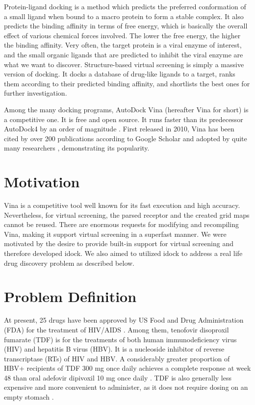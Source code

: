 \documentclass[10pt, conference, compsocconf]{IEEEtran}
\begin{document}
Protein-ligand docking is a method which predicts the preferred conformation of a small ligand when bound to a macro protein to form a stable complex. It also predicts the binding affinity in terms of free energy, which is basically the overall effect of various chemical forces involved. The lower the free energy, the higher the binding affinity. Very often, the target protein is a viral enzyme of interest, and the small organic ligands that are predicted to inhibit the viral enzyme are what we want to discover. Structure-based virtual screening is simply a massive version of docking. It docks a database of drug-like ligands to a target, ranks them according to their predicted binding affinity, and shortlists the best ones for further investigation.

Among the many docking programs, AutoDock Vina \cite{595} (hereafter Vina for short) is a competitive one. It is free and open source. It runs faster than its predecessor AutoDock4 \cite{596} by an order of magnitude \cite{556}. First released in 2010, Vina has been cited by over 200 publications according to Google Scholar and adopted by quite many researchers \cite{609}, demonstrating its popularity.

\section{Motivation}

Vina is a competitive tool well known for its fast execution and high accuracy. Nevertheless, for virtual screening, the parsed receptor and the created grid maps cannot be reused. There are enormous requests for modifying and recompiling Vina, making it support virtual screening in a superfast manner. We were motivated by the desire to provide built-in support for virtual screening and therefore developed idock. We also aimed to utilized idock to address a real life drug discovery problem as described below.

\section{Problem Definition}

At present, 25 drugs have been approved by US Food and Drug Administration (FDA) for the treatment of HIV/AIDS \cite{300}. Among them, tenofovir disoproxil fumarate (TDF) is for the treatments of both human immunodeficiency virus (HIV) and hepatitis B virus (HBV). It is a nucleoside inhibitor of reverse transcriptase (RTs) of HIV and HBV. A considerably greater proportion of HBV+ recipients of TDF 300 mg once daily achieves a complete response at week 48 than oral adefovir dipivoxil 10 mg once daily \cite{165}. TDF is also generally less expensive and more convenient to administer, as it does not require dosing on an empty stomach \cite{159}.
\end{document}
